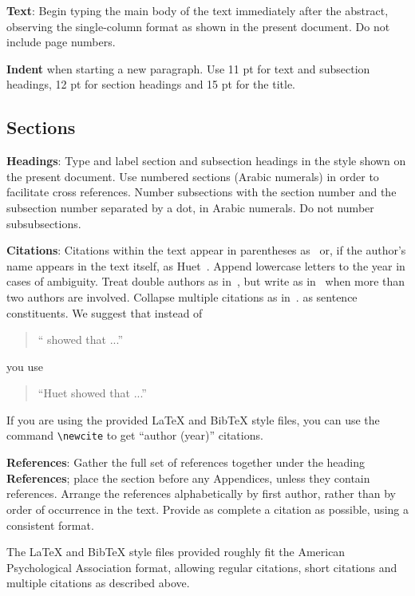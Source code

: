 \documentclass[11pt]{article}
\begin{document}
{\bf Text}: Begin typing the main body of the text immediately after
the abstract, observing the single-column format as shown in 
the present document. Do not include page numbers.

{\bf Indent} when starting a new paragraph. Use 11 pt for text and 
subsection headings, 12 pt for section headings and 15 pt for
the title. 

\subsection{Sections}

{\bf Headings}: Type and label section and subsection headings in the
style shown on the present document.  Use numbered sections (Arabic
numerals) in order to facilitate cross references. Number subsections
with the section number and the subsection number separated by a dot,
in Arabic numerals. Do not number subsubsections.

{\bf Citations}: Citations within the text appear in parentheses
as~\cite{zen2} or, if the author's name appears in the text
itself, as Huet~.  Append lowercase letters
to the year in cases of ambiguity.  Treat double authors as
in~\cite{scharf-hyman09}, but write as in~\cite{platform12} when more than two
authors are involved. Collapse multiple citations as
in~\cite{zen2,platform12}. 
as sentence constituents. We suggest that instead of
\begin{quote}
  ``\cite{zen2} showed that ...''
\end{quote}
you use
\begin{quote}
``Huet    showed that ...''
\end{quote}

If you are using the provided \LaTeX{} and Bib\TeX{} style files, you
can use the command \verb|\newcite| to get ``author (year)'' citations.

\textbf{References}: Gather the full set of references together under
the heading {\bf References}; place the section before any Appendices,
unless they contain references. Arrange the references alphabetically
by first author, rather than by order of occurrence in the text.
Provide as complete a citation as possible, using a consistent format.

The \LaTeX{} and Bib\TeX{} style files provided roughly fit the
American Psychological Association format, allowing regular citations, 
short citations and multiple citations as described above.
\end{document}
